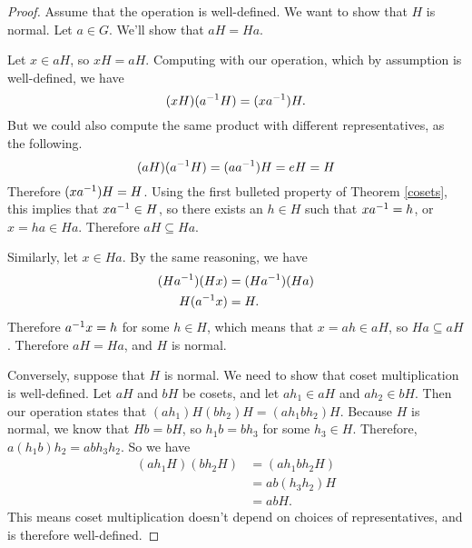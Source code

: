 \begin{proof}
Assume that the operation is well-defined. We want to show that $H$ is normal. Let $a \in G$. We'll show that $aH = Ha$.

Let $x \in aH$, so $xH = aH$. Computing with our operation, which by assumption is well-defined, we have
\begin{equation*}
    (xH)(a^{-1} H) = (xa^{-1})H.
\end{equation*}
But we could also compute the same product with different representatives, as the following.
\begin{equation*}
    (aH)(a^{-1} H) = (a a^{-1})H = eH = H
\end{equation*}
Therefore $(xa^{-1})H = H$. Using the first bulleted property of Theorem \ref{cosets}, this implies that $xa^{-1} \in H$, so there exists an $h \in H$ such that $xa^{-1} = h$, or $x = ha \in Ha$. Therefore $aH \subseteq Ha$.

Similarly, let $x \in Ha$. By the same reasoning, we have
\begin{align*}
    (Ha^{-1})(Hx) &= (Ha^{-1})(Ha) \\
    H(a^{-1} x) &= H.
\end{align*}
Therefore $a^{-1} x = h$ for some $h \in H$, which means that $x = ah \in aH$, so $Ha \subseteq aH$. Therefore $aH = Ha$, and $H$ is normal.

Conversely, suppose that $H$ is normal. We need to show that coset multiplication is well-defined. Let $aH$ and $bH$ be cosets, and let $ah_1 \in aH$ and $ah_2 \in bH$. Then our operation states that $(ah_1)H(bh_2)H = (ah_1bh_2)H$. Because $H$ is normal, we know that $Hb = bH$, so $h_1 b = b h_3$ for some $h_3 \in H$. Therefore, $a\left(h_1b\right) h_2 = ab h_3 h_2$. So we have
\begin{align*}
    \left(ah_1 H\right)\left(bh_2 H\right) &= \left(ah_1bh_2 H\right) \\
    &= ab\left(h_3 h_2\right)H \\
    &= ab H.
\end{align*}
This means coset multiplication doesn't depend on choices of representatives, and is therefore well-defined.

\end{proof}

